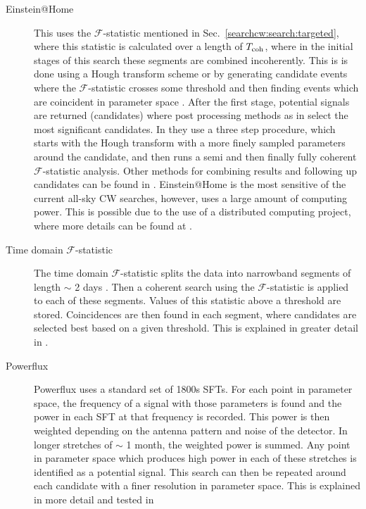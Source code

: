 \begin{description}
        \item[Einstein@Home] This uses the
$\mathcal{F}$-statistic mentioned in Sec.~\ref{searchcw:search:targeted}, where this statistic is calculated over a length of $T_{\rm{coh}}$, where in the initial stages of this search these segments are combined incoherently. This is is done using a Hough transform scheme \citep{theligoscientificcollaborationandthevirgocollaboration2013EinsteinHome} or by generating candidate events where the $\mathcal{F}$-statistic crosses some threshold and then finding events which are coincident in parameter space \citep{ligoscientificcollaboration2009EinsteinHome}.
After the first stage, potential signals are returned (candidates) where post processing methods as in \citep{theligoscientificcollaborationandthevirgocollaboration2013EinsteinHome} select the most significant candidates.
In \citep{theligoscientificcollaborationandthevirgocollaboration2013EinsteinHome} they use a three step procedure, which starts with the Hough transform with a more finely sampled parameters around the candidate, and then runs a semi and then finally fully coherent $\mathcal{F}$-statistic analysis.
Other methods for combining results and following up candidates can be found in \citep{singh2016ResultsAllsky,papa2016HierarchicalFollowup,walsh2016ComparisonMethods}.
Einstein@Home is the most sensitive of the current all-sky \gls{CW} searches,
however, uses a large amount of computing power. This is possible due to the use of a
distributed computing project, where more details can be found at
\citep{EinsteinHome}. 
	
        \item[Time domain $\mathcal{F}$-statistic] The time domain
$\mathcal{F}$-statistic splits the data into narrowband segments of length
$\sim$ 2 days \citep{walsh2016ComparisonMethods}. Then a coherent search using
the $\mathcal{F}$-statistic is applied to each of these segments. Values of
this statistic above a threshold are stored. Coincidences are then found in
each segment, where candidates are selected best based on a given
threshold. This is explained in greater detail in
\citep{aasi2014ImplementationTextdollar,walsh2016ComparisonMethods}.
	
        \item[Powerflux] Powerflux uses a standard set of 1800s \glspl{SFT}.
For each point in parameter space, the frequency of a signal with those parameters is found and the power in each \gls{SFT} at that frequency is recorded. This power is then weighted depending on the antenna pattern and
noise of the detector. In longer stretches of $\sim$ 1 month, the weighted
power is summed. Any point in parameter space which produces high power in each
of these stretches is identified as a potential signal. This search can then be
repeated around each candidate with a finer resolution in parameter space. This
is explained in more detail and tested in
\citep{abadie2012AllskySearch,walsh2016ComparisonMethods,ligoscientificcollaborationandvirgocollaboration2016ComprehensiveAllsky}
	

\end{description}
